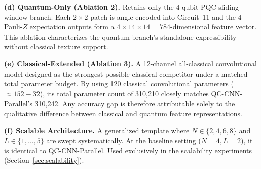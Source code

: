 \documentclass[journal]{IEEEtran}
\begin{document}
\textbf{(d) Quantum-Only (Ablation 2).} Retains only the 4-qubit PQC sliding-window branch. Each $2 \times 2$ patch is angle-encoded into Circuit~11 and the 4 Pauli-$Z$ expectation outputs form a $4 \times 14 \times 14 = 784$-dimensional feature vector. This ablation characterizes the quantum branch's standalone expressibility without classical texture support.

\textbf{(e) Classical-Extended (Ablation 3).} A 12-channel all-classical convolutional model designed as the strongest possible classical competitor under a matched total parameter budget. By using 120 classical convolutional parameters ($\approx 152 - 32$), its total parameter count of 310,210 closely matches QC-CNN-Parallel's 310,242. Any accuracy gap is therefore attributable solely to the qualitative difference between classical and quantum feature representations.

\textbf{(f) Scalable Architecture.} A generalized template where $N \in \{2, 4, 6, 8\}$ and $L \in \{1, \dots, 5\}$ are swept systematically. At the baseline setting ($N=4, L=2$), it is identical to QC-CNN-Parallel. Used exclusively in the scalability experiments (Section~\ref{sec:scalability}).

\begin{table}[!htbp]
\centering
\caption{Comprehensive Parameter Accounting and Architectural Specifications Across the Extended Model Suite}
\label{tab:param_accounting}
\renewcommand{\arraystretch}{1.2}
\end{table}
\end{document}
